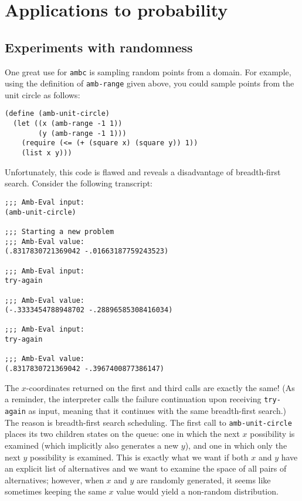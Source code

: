 \documentclass{article}
\begin{document}
\section{Applications to probability}

\subsection{Experiments with randomness}

One great use for \texttt{ambc} is sampling random points from a domain. For
example, using the definition of \texttt{amb-range} given above, you could
sample points from the unit circle as follows:
\begin{lstlisting}
(define (amb-unit-circle)
  (let ((x (amb-range -1 1))
        (y (amb-range -1 1)))
    (require (<= (+ (square x) (square y)) 1))
    (list x y)))
\end{lstlisting}

Unfortunately, this code is flawed and reveals a disadvantage of
breadth-first search. Consider the following transcript:
\begin{lstlisting}
;;; Amb-Eval input:
(amb-unit-circle)

;;; Starting a new problem
;;; Amb-Eval value:
(.8317830721369042 -.01663187759243523)

;;; Amb-Eval input:
try-again

;;; Amb-Eval value:
(-.3333454788948702 -.28896585308416034)

;;; Amb-Eval input:
try-again

;;; Amb-Eval value:
(.8317830721369042 -.3967400877386147)
\end{lstlisting}

The $x$-coordinates returned on the first and third calls are exactly
the same!  (As a reminder, the interpreter calls the failure
continuation upon receiving \texttt{try-again} as input, meaning that
it continues with the same breadth-first search.) The reason is
breadth-first search scheduling. The first call to
\texttt{amb-unit-circle} places its two children states on the queue:
one in which the next $x$ possibility is examined (which implicitly
also generates a new $y$), and one in which only the next $y$
possibility is examined. This is exactly what we want if both $x$ and
$y$ have an explicit list of alternatives and we want to examine the
space of all pairs of alternatives; however, when $x$ and $y$ are
randomly generated, it seems like sometimes keeping the same $x$ value
would yield a non-random distribution.
\end{document}
